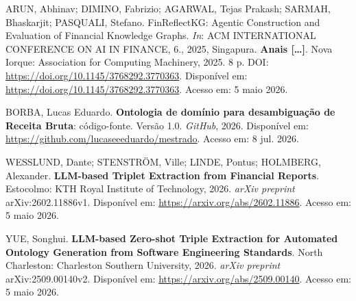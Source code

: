 \documentclass[12pt,a4paper]{article}
\begin{document}
\begin{flushleft}
\setlength{\parskip}{\baselineskip}
\setlength{\parindent}{0pt}

ARUN, Abhinav; DIMINO, Fabrizio; AGARWAL, Tejas Prakash; SARMAH, Bhaskarjit; PASQUALI, Stefano. FinReflectKG: Agentic Construction and Evaluation of Financial Knowledge Graphs. \textit{In}: ACM INTERNATIONAL CONFERENCE ON AI IN FINANCE, 6., 2025, Singapura. \textbf{Anais [\ldots]}. Nova Iorque: Association for Computing Machinery, 2025. 8 p. DOI: \url{https://doi.org/10.1145/3768292.3770363}. Disponível em: \url{https://doi.org/10.1145/3768292.3770363}. Acesso em: 5 maio 2026.

BORBA, Lucas Eduardo. \textbf{Ontologia de domínio para desambiguação de Receita Bruta}: código-fonte. Versão 1.0. \textit{GitHub}, 2026. Disponível em: \url{https://github.com/lucaseeeduardo/mestrado}. Acesso em: 8 jul. 2026.

WESSLUND, Dante; STENSTRÖM, Ville; LINDE, Pontus; HOLMBERG, Alexander. \textbf{LLM-based Triplet Extraction from Financial Reports}. Estocolmo: KTH Royal Institute of Technology, 2026. \textit{arXiv preprint} arXiv:2602.11886v1. Disponível em: \url{https://arxiv.org/abs/2602.11886}. Acesso em: 5 maio 2026.

YUE, Songhui. \textbf{LLM-based Zero-shot Triple Extraction for Automated Ontology Generation from Software Engineering Standards}. North Charleston: Charleston Southern University, 2026. \textit{arXiv preprint} arXiv:2509.00140v2. Disponível em: \url{https://arxiv.org/abs/2509.00140}. Acesso em: 5 maio 2026.

\end{flushleft}
\end{document}
